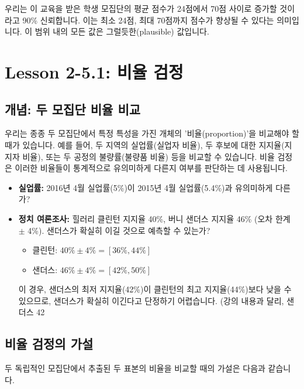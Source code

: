 \documentclass[11pt,a4paper]{article}
\theoremstyle{definition}
\begin{document}
\begin{summarybox}[title=90\% 신뢰 구간 해석]
우리는 이 교육을 받은 학생 모집단의 평균 점수가 24점에서 70점 사이로 증가할 것이라고 90\% 신뢰합니다. 이는 최소 24점, 최대 70점까지 점수가 향상될 수 있다는 의미입니다. 이 범위 내의 모든 값은 그럴듯한(plausible) 값입니다.
\end{summarybox}

\newpage
\section{Lesson 2-5.1: 비율 검정}

\subsection{개념: 두 모집단 비율 비교}
우리는 종종 두 모집단에서 특정 특성을 가진 개체의 '비율(proportion)'을 비교해야 할 때가 있습니다. 예를 들어, 두 지역의 실업률(실업자 비율), 두 후보에 대한 지지율(지지자 비율), 또는 두 공정의 불량률(불량품 비율) 등을 비교할 수 있습니다. 비율 검정은 이러한 비율들이 통계적으로 유의미하게 다른지 여부를 판단하는 데 사용됩니다.

\begin{examplebox}[title=비율 비교의 실제 사례]
\begin{itemize}
    \item \textbf{실업률:} 2016년 4월 실업률(5\%)이 2015년 4월 실업률(5.4\%)과 유의미하게 다른가?
    \item \textbf{정치 여론조사:} 힐러리 클린턴 지지율 40\%, 버니 샌더스 지지율 46\% (오차 한계 $\pm$ 4\%). 샌더스가 확실히 이길 것으로 예측할 수 있는가?
    \begin{itemize}
        \item 클린턴: $40\% \pm 4\% = [36\%, 44\%]$
        \item 샌더스: $46\% \pm 4\% = [42\%, 50\%]$
    \end{itemize}
    이 경우, 샌더스의 최저 지지율(42\%)이 클린턴의 최고 지지율(44\%)보다 낮을 수 있으므로, 샌더스가 확실히 이긴다고 단정하기 어렵습니다. (강의 내용과 달리, 샌더스 42%
\end{itemize}
\end{examplebox}

\subsection{비율 검정의 가설}
두 독립적인 모집단에서 추출된 두 표본의 비율을 비교할 때의 가설은 다음과 같습니다.
\end{document}
